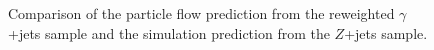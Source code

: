 \begin{figure}[!htbp]
\begin{center}
\caption{Comparison of the particle flow \met prediction from the reweighted $\gamma$+jets sample
and the simulation prediction from the $Z$+jets sample.}
\label{fig:PhotonJetsClosureTest}
\end{center}
\end{figure}

